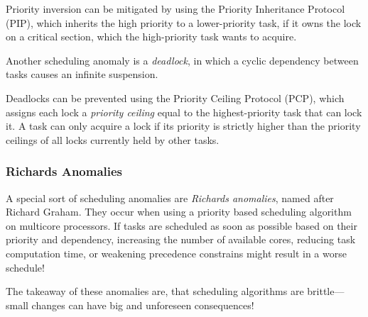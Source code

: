 Priority inversion can be mitigated by using the Priority Inheritance Protocol (PIP), which inherits the high priority to a lower-priority task, if it owns the lock on a critical section, which the high-priority task wants to acquire.

Another scheduling anomaly is a \emph{deadlock}, in which a cyclic dependency between tasks causes an infinite suspension.

Deadlocks can be prevented using the Priority Ceiling Protocol (PCP), which assigns each lock a \emph{priority ceiling} equal to the highest-priority task that can lock it.
A task can only acquire a lock if its priority is strictly higher than the priority ceilings of all locks currently held by other tasks.

\subsubsection{Richards Anomalies}
A special sort of scheduling anomalies are \emph{Richards anomalies}, named after Richard Graham.
They occur when using a priority based scheduling algorithm on multicore processors.
If tasks are scheduled as soon as possible based on their priority and dependency, increasing the number of available cores, reducing task computation time, or weakening precedence constrains might result in a worse schedule!

The takeaway of these anomalies are, that scheduling algorithms are brittle---small changes can have big and unforeseen consequences!
